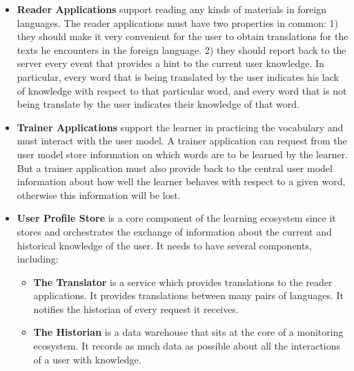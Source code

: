 \begin{itemize}
	
	\item {\bf Reader Applications} 
	support reading any kinds of materials in foreign languages. The reader applications must have two properties in common: 
		1) they should make it very convenient for the user to obtain translations for the texts he encounters in the foreign language. 
		2) they should report back to the server every event that provides a hint to the current user knowledge. In particular, every word that is being translated by the user indicates his lack of knowledge with respect to that particular word, and every word that is not being translate by the user indicates their knowledge of that word.
	
		\item {\bf Trainer Applications} support the learner in practicing the vocabulary and must interact with the user model. A trainer application can request from the user model store information on which words are to be learned by the learner. But a trainer application must also provide back to the central user model information about how well the learner behaves with respect to a given word, otherwise this information will be lost. 


		\item {\bf User Profile Store} 
		is a core component of the learning ecosystem since it stores and orchestrates the exchange of information about the current and historical knowledge of the user. It needs to have several components, including: 

		\newcommand {\archiblock}[1]{\item {\bf #1}}

		\begin{itemize}

			\archiblock{The Translator} is a service which provides translations to the reader applications. It provides translations between many pairs of languages. It notifies the historian of every request it receives. 

			\archiblock{The Historian} is a data warehouse that sits at the core of a monitoring ecosystem. It records as much data as possible about all the interactions of a user with knowledge. 


\end{itemize}
\end{itemize}
